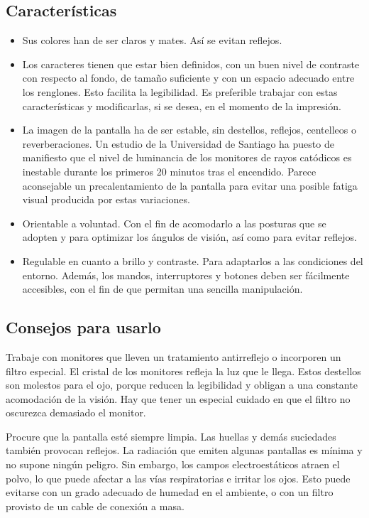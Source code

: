 \subsection{Características}
\begin{itemize}
\item Sus colores han de ser claros y mates. Así se evitan reflejos.
\item Los caracteres tienen que estar bien definidos, con un buen nivel de contraste con respecto al fondo, de tamaño suficiente y con un espacio adecuado entre los renglones. Esto facilita la legibilidad. Es preferible trabajar con estas características y modificarlas, si se desea, en el momento de la impresión.
\item La imagen de la pantalla ha de ser estable, sin destellos, reflejos, centelleos o reverberaciones. Un estudio de la Universidad de Santiago ha puesto de manifiesto que el nivel de luminancia de los monitores de rayos catódicos es inestable durante los primeros 20 minutos tras el encendido. Parece aconsejable un precalentamiento de la pantalla para evitar una posible fatiga visual producida por estas variaciones.
\item Orientable a voluntad. Con el fin de acomodarlo a las posturas que se adopten y para optimizar los ángulos de visión, así como para evitar reflejos.
\item Regulable en cuanto a brillo y contraste. Para adaptarlos a las condiciones del entorno. Además, los mandos, interruptores y botones deben ser fácilmente accesibles, con el fin de que permitan una sencilla manipulación.
\end{itemize}

\subsection{Consejos para usarlo}
Trabaje con monitores que lleven un tratamiento antirreflejo o incorporen un filtro especial. El cristal de los monitores refleja la luz que le llega. Estos destellos son molestos para el ojo, porque reducen la legibilidad y obligan a una constante acomodación de la visión. Hay que tener un especial cuidado en que el filtro no oscurezca demasiado el monitor.

Procure que la pantalla esté siempre limpia. Las huellas y demás suciedades también provocan reflejos. La radiación que emiten algunas pantallas es mínima y no supone ningún peligro. Sin embargo, los campos electroestáticos atraen el polvo, lo que puede afectar a las vías respiratorias e irritar los ojos. Esto puede evitarse con un grado adecuado de humedad en el ambiente, o con un filtro provisto de un cable de conexión a masa.

